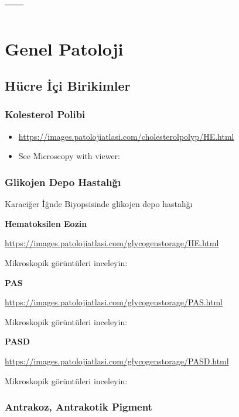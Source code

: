 \documentclass[
  letterpaper,
  DIV=11,
  numbers=noendperiod]{scrreprt}
\begin{document}
\part{---}

\part{Genel Patoloji}

\hypertarget{huxfccre-iuxe7i-birikimler}{%
\chapter{Hücre İçi Birikimler}\label{huxfccre-iuxe7i-birikimler}}

\hypertarget{kolesterol-polibi}{%
\section{Kolesterol Polibi}\label{kolesterol-polibi}}

\begin{itemize}
\item
  \url{https://images.patolojiatlasi.com/cholesterolpolyp/HE.html}
\item
  See Microscopy with viewer:
\end{itemize}

\hypertarget{glikojen-depo-hastalux131ux11fux131}{%
\section{Glikojen Depo
Hastalığı}\label{glikojen-depo-hastalux131ux11fux131}}

Karaciğer İğnde Biyopsisinde glikojen depo hastalığı

\textbf{Hematoksilen Eozin}

\url{https://images.patolojiatlasi.com/glycogenstorage/HE.html}

Mikroskopik görüntüleri inceleyin:

\textbf{PAS}

\url{https://images.patolojiatlasi.com/glycogenstorage/PAS.html}

Mikroskopik görüntüleri inceleyin:

\textbf{PASD}

\url{https://images.patolojiatlasi.com/glycogenstorage/PASD.html}

Mikroskopik görüntüleri inceleyin:

\hypertarget{antrakoz-antrakotik-pigment}{%
\section{Antrakoz, Antrakotik
Pigment}\label{antrakoz-antrakotik-pigment}}
\end{document}
